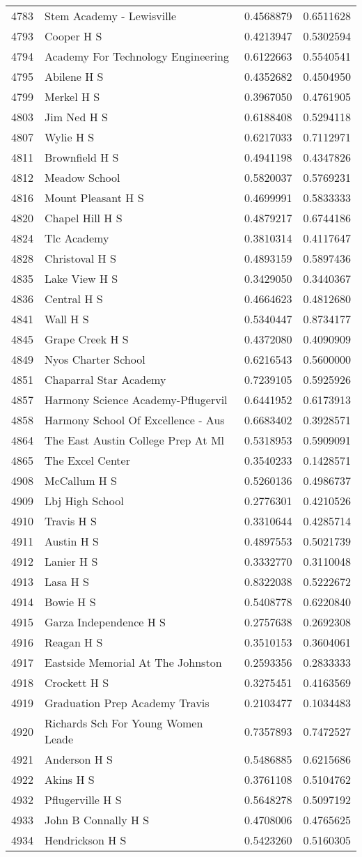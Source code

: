\documentclass[
]{article}
\begin{document}
\begin{longtable}[]{@{}llrr@{}}
4783 & Stem Academy - Lewisville & 0.4568879 & 0.6511628\tabularnewline
4793 & Cooper H S & 0.4213947 & 0.5302594\tabularnewline
4794 & Academy For Technology Engineering & 0.6122663 &
0.5540541\tabularnewline
4795 & Abilene H S & 0.4352682 & 0.4504950\tabularnewline
4799 & Merkel H S & 0.3967050 & 0.4761905\tabularnewline
4803 & Jim Ned H S & 0.6188408 & 0.5294118\tabularnewline
4807 & Wylie H S & 0.6217033 & 0.7112971\tabularnewline
4811 & Brownfield H S & 0.4941198 & 0.4347826\tabularnewline
4812 & Meadow School & 0.5820037 & 0.5769231\tabularnewline
4816 & Mount Pleasant H S & 0.4699991 & 0.5833333\tabularnewline
4820 & Chapel Hill H S & 0.4879217 & 0.6744186\tabularnewline
4824 & Tlc Academy & 0.3810314 & 0.4117647\tabularnewline
4828 & Christoval H S & 0.4893159 & 0.5897436\tabularnewline
4835 & Lake View H S & 0.3429050 & 0.3440367\tabularnewline
4836 & Central H S & 0.4664623 & 0.4812680\tabularnewline
4841 & Wall H S & 0.5340447 & 0.8734177\tabularnewline
4845 & Grape Creek H S & 0.4372080 & 0.4090909\tabularnewline
4849 & Nyos Charter School & 0.6216543 & 0.5600000\tabularnewline
4851 & Chaparral Star Academy & 0.7239105 & 0.5925926\tabularnewline
4857 & Harmony Science Academy-Pflugervil & 0.6441952 &
0.6173913\tabularnewline
4858 & Harmony School Of Excellence - Aus & 0.6683402 &
0.3928571\tabularnewline
4864 & The East Austin College Prep At Ml & 0.5318953 &
0.5909091\tabularnewline
4865 & The Excel Center & 0.3540233 & 0.1428571\tabularnewline
4908 & McCallum H S & 0.5260136 & 0.4986737\tabularnewline
4909 & Lbj High School & 0.2776301 & 0.4210526\tabularnewline
4910 & Travis H S & 0.3310644 & 0.4285714\tabularnewline
4911 & Austin H S & 0.4897553 & 0.5021739\tabularnewline
4912 & Lanier H S & 0.3332770 & 0.3110048\tabularnewline
4913 & Lasa H S & 0.8322038 & 0.5222672\tabularnewline
4914 & Bowie H S & 0.5408778 & 0.6220840\tabularnewline
4915 & Garza Independence H S & 0.2757638 & 0.2692308\tabularnewline
4916 & Reagan H S & 0.3510153 & 0.3604061\tabularnewline
4917 & Eastside Memorial At The Johnston & 0.2593356 &
0.2833333\tabularnewline
4918 & Crockett H S & 0.3275451 & 0.4163569\tabularnewline
4919 & Graduation Prep Academy Travis & 0.2103477 &
0.1034483\tabularnewline
4920 & Richards Sch For Young Women Leade & 0.7357893 &
0.7472527\tabularnewline
4921 & Anderson H S & 0.5486885 & 0.6215686\tabularnewline
4922 & Akins H S & 0.3761108 & 0.5104762\tabularnewline
4932 & Pflugerville H S & 0.5648278 & 0.5097192\tabularnewline
4933 & John B Connally H S & 0.4708006 & 0.4765625\tabularnewline
4934 & Hendrickson H S & 0.5423260 & 0.5160305\tabularnewline

\end{longtable}
\end{document}
